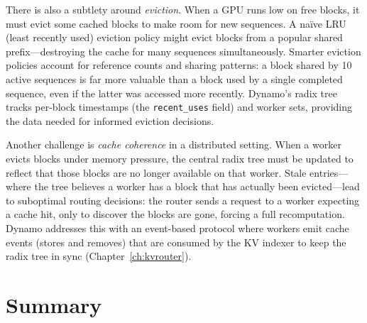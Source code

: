 %
There is also a subtlety around \emph{eviction}. When a GPU runs low on free blocks, it must evict some cached blocks to make room for new sequences. A na\"ive LRU (least recently used) eviction policy might evict blocks from a popular shared prefix---destroying the cache for many sequences simultaneously. Smarter eviction policies account for reference counts and sharing patterns: a block shared by 10 active sequences is far more valuable than a block used by a single completed sequence, even if the latter was accessed more recently. Dynamo's radix tree tracks per-block timestamps (the \texttt{recent\_uses} field) and worker sets, providing the data needed for informed eviction decisions.

Another challenge is \emph{cache coherence} in a distributed setting. When a worker evicts blocks under memory pressure, the central radix tree must be updated to reflect that those blocks are no longer available on that worker. Stale entries---where the tree believes a worker has a block that has actually been evicted---lead to suboptimal routing decisions: the router sends a request to a worker expecting a cache hit, only to discover the blocks are gone, forcing a full recomputation. Dynamo addresses this with an event-based protocol where workers emit cache events (stores and removes) that are consumed by the KV indexer to keep the radix tree in sync (Chapter~\ref{ch:kvrouter}).

\section{Summary}


